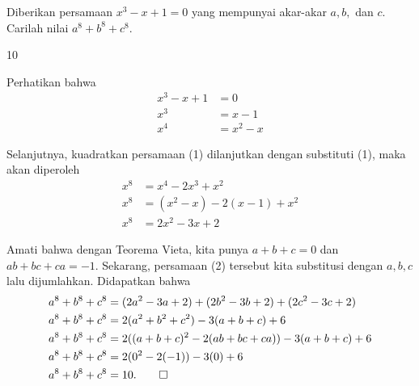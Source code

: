 \documentclass[11pt]{scrartcl}
\begin{document}
	\begin{soalbaru}
		Diberikan persamaan $x^3-x+1=0$ yang mempunyai akar-akar $a,b,$ dan $c$. Carilah nilai $a^8+b^8+c^8$.
		\begin{jawaban}
		10
		\end{jawaban}
		\begin{solusi}
		Perhatikan bahwa \begin{equation}
		\begin{split}
		x^3 - x +1&=0\\
		x^3 &= x-1\\
		x^4 &= x^2 -x
		\end{split}
		\end{equation}
		
		Selanjutnya, kuadratkan persamaan (1) dilanjutkan dengan substituti (1), maka akan diperoleh
		\begin{equation}
		\begin{split}
		x^8 &= x^4 -2x^3 +x^2\\
		x^8 &= (x^2-x)-2(x-1)+x^2\\
		x^8 &= 2x^2-3x+2
		\end{split}
		\end{equation}
		
		Amati bahwa dengan Teorema Vieta, kita punya $a+b+c=0$ dan $ab+bc+ca=-1$. Sekarang, persamaan (2) tersebut kita substitusi dengan $a,b,c$ lalu dijumlahkan. Didapatkan bahwa
		\begin{equation*}
		\begin{split}
		a^8+b^8+c^8&=(2a^2-3a+2)+(2b^2-3b+2)+(2c^2-3c+2)\\
		a^8+b^8+c^8&=2(a^2+b^2+c^2)-3(a+b+c)+6\\
		a^8+b^8+c^8&=2((a+b+c)^2-2(ab+bc+ca))-3(a+b+c)+6\\
		a^8+b^8+c^8&=2(0^2-2(-1))-3(0)+6\\
		a^8+b^8+c^8&=10. \qed
		\end{split}
		\end{equation*}
		\end{solusi}
	\end{soalbaru}
	
\end{document}
